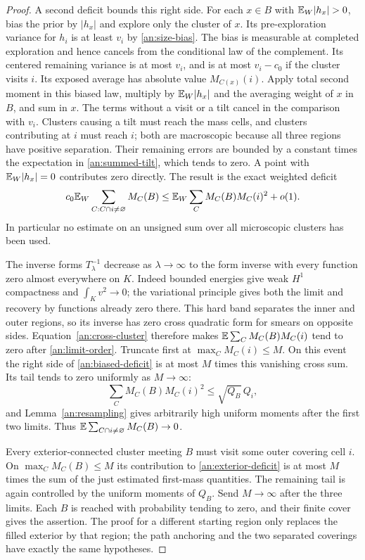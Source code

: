 \begin{proof}
A second deficit bounds this right side.  For each $x\in B$
with $\E_W|h_x|>0$, bias the prior by $|h_x|$ and explore only
the cluster of $x$.  Its pre-exploration variance for $h_i$ is
at least $v_i$ by \eqref{an:size-bias}.  The bias is measurable
at completed exploration and hence cancels from the conditional
law of the complement.  Its centered remaining variance is at
most $v_i$, and is at most $v_i-c_0$ if the cluster visits $i$.
Its exposed average has absolute value $M_{C(x)}(i)$.
Apply total second moment in this biased law, multiply by
$\mathbb E_W|h_x|$ and the averaging weight of $x$ in $B$, and sum in
$x$.  The terms without a visit or a tilt cancel in the
comparison with $v_i$.  Clusters causing a tilt must reach the
mass cells, and clusters contributing at $i$ must reach $i$;
both are macroscopic because all three regions have positive
separation.  Their remaining errors are bounded by a constant
times the expectation in \eqref{an:summed-tilt}, which tends
to zero.  A point with $\mathbb E_W|h_x|=0$ contributes zero directly.
The result is the exact weighted deficit
\begin{equation}
 c_0\mathbb E_W\sum_{C:C\cap i\ne\varnothing}M_C(B)
       \le\mathbb E_W\sum_CM_C(B)M_C(i)^2+o(1).
 \label{an:biased-deficit}
\end{equation}
In particular no estimate on an unsigned sum over all
microscopic clusters has been used.

The inverse forms $T_\lambda^{-1}$ decrease as
$\lambda\to\infty$ to the form inverse with every function
zero almost everywhere on $K$.  Indeed bounded energies give
weak $H^1$ compactness and $\int_Kv^2\to0$; the variational
principle gives both the limit and recovery by functions already
zero there.  This hard band separates the inner and outer
regions, so its inverse has zero cross quadratic form for
smears on opposite sides.  Equation~\eqref{an:cross-cluster}
therefore makes $\mathbb E\sum_CM_C(B)M_C(i)$ tend to zero after
\eqref{an:limit-order}.  Truncate first at
$\max_CM_C(i)\le M$.  On this event the right side of
\eqref{an:biased-deficit} is at most $M$ times this vanishing
cross sum.  Its tail tends to zero uniformly as $M\to\infty$:
\[
 \sum_CM_C(B)M_C(i)^2\le\sqrt{Q_B}\,Q_i,
\]
and Lemma~\ref{an:resampling} gives arbitrarily high uniform
moments after the first two limits.  Thus
$\mathbb E\sum_{C\cap i\ne\varnothing}M_C(B)\to0$.

Every exterior-connected cluster meeting $B$ must visit some
outer covering cell $i$.  On $\max_CM_C(B)\le M$ its
contribution to \eqref{an:exterior-deficit} is at most $M$ times
the sum of the just estimated first-mass quantities.  The
remaining tail is again controlled by the uniform moments of
$Q_B$.  Send $M\to\infty$ after the three limits.  Each $B$ is
reached with probability tending to zero, and their finite
cover gives the assertion.  The proof for a different starting
region only replaces the filled exterior by that region; the
path anchoring and the two separated coverings have exactly the
same hypotheses.
\end{proof}


